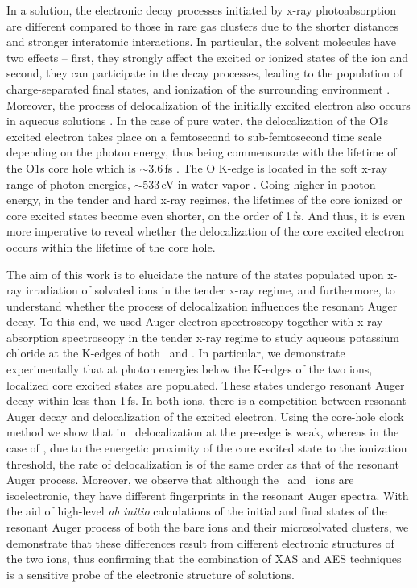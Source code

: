 In a solution, the electronic decay processes initiated by x-ray photoabsorption are different compared to those in rare gas clusters due to the shorter distances and stronger interatomic interactions. In particular, the solvent molecules have two effects -- first, they strongly affect the excited \citep{miteva16:16671} or ionized states of the ion and second, they can participate in the decay processes, leading to the population of charge-separated final states, and ionization of the surrounding environment \citep{Pokapanich09:7264,Pokapanich11:13430,Stumpf16:237,ceolin17:263003,unger17:708}. Moreover, the process of delocalization of the initially excited electron also occurs in aqueous solutions \citep{Nordlund07:217406,Ottosson11:13489}.
In the case of pure water, the delocalization of the O1s excited electron takes place on a femtosecond to sub-femtosecond time scale depending on the photon energy, thus being commensurate with the lifetime of the O1s core hole which is $\sim$3.6\,fs \citep{Nordlund07:217406}. The O K-edge is located in the soft x-ray range of photon energies, $\sim$533\,eV in water vapor \citep{wagner80:1445}. Going higher in photon energy, in the tender and hard x-ray regimes, the lifetimes of the core ionized or core excited states become even shorter, on the order of 1\,fs. And thus, it is even more imperative to reveal whether the delocalization of the core excited electron occurs within the lifetime of the core hole.


The aim of this work is to elucidate the nature of the states populated upon x-ray irradiation of solvated ions in the tender x-ray regime, and furthermore, to understand whether the process of delocalization influences the resonant Auger decay. To this end, we used Auger electron spectroscopy together with x-ray absorption spectroscopy in the tender x-ray regime to study aqueous potassium chloride at the K-edges of both \ki~and \cli. In particular, we demonstrate experimentally that at photon energies below the K-edges of the two ions, localized core excited states are populated. These states undergo resonant Auger decay within less than 1\,fs. In both ions, there is a competition between resonant Auger decay and delocalization of the excited electron. Using the core-hole clock method we show that in \ki~delocalization at the pre-edge is weak, whereas in the case of \cli, due to the energetic proximity of the core excited state to the ionization threshold, the rate of delocalization is of the same order as that of the resonant Auger process. Moreover, we observe that although the \ki~and \cli~ions are isoelectronic, they have different fingerprints in the resonant Auger spectra. With the aid of high-level {\it ab initio} calculations of the initial and final states of the resonant Auger process of both the bare ions and their microsolvated clusters, we demonstrate that these differences result from different electronic structures of the two ions, thus confirming that the combination of XAS and AES techniques is a sensitive probe of the electronic structure of solutions.


